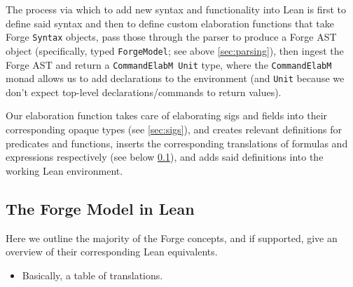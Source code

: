 The process via which to add new syntax and functionality into Lean is first to define said syntax and then to define custom elaboration functions that take Forge \texttt{Syntax} objects, pass those through the parser to produce a Forge AST object (specifically, typed \texttt{ForgeModel}; see above \cref{sec:parsing}), then ingest the Forge AST and return a \texttt{CommandElabM Unit} type, where the \texttt{CommandElabM} monad allows us to add declarations to the environment (and \texttt{Unit} because we don't expect top-level declarations/commands to return values). 

Our elaboration function takes care of elaborating sigs and fields into their corresponding opaque types (see \cref{sec:sigs}), and creates relevant definitions for predicates and functions, inserts the corresponding translations of formulas and expressions respectively (see below \cref{sec:forge-model}), and adds said definitions into the working Lean environment.

\subsection{The Forge Model in Lean}\label{sec:forge-model}
Here we outline the majority of the Forge concepts, and if supported, give an overview of their corresponding Lean equivalents. 

{\color{OliveGreen}
\begin{itemize}
  \item Basically, a table of translations. 
\end{itemize}
}


